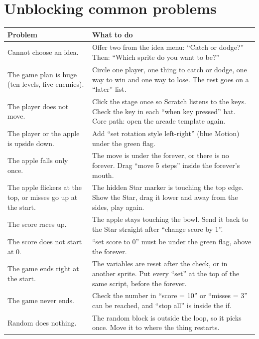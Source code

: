 \documentclass[track=junior,level=2,teacher]{kidscode}
\begin{document}
\section{Unblocking common problems}
\begin{center}\small\renewcommand{\arraystretch}{1.3}
\begin{longtable}{@{}>{\RaggedRight}p{5.2cm}>{\RaggedRight\arraybackslash}p{\dimexpr\linewidth-5.2cm-2\tabcolsep}@{}}
\toprule
\textbf{Problem} & \textbf{What to do}\\
\midrule\endhead
\bottomrule\endfoot
Cannot choose an idea. & Offer two from the idea menu: \enquote{Catch or dodge?} Then: \enquote{Which sprite do you want to be?}\\
The game plan is huge (ten levels, five enemies). & Circle one player, one thing to catch or dodge, one way to win and one way to lose. The rest goes on a \enquote{later} list.\\
The player does not move. & Click the stage once so Scratch listens to the keys. Check the key in each \enquote{when key pressed} hat. Core path: open the arcade template again.\\
The player or the apple is upside down. & Add \enquote{set rotation style left-right} (blue Motion) under the green flag.\\
The apple falls only once. & The move is under the forever, or there is no forever. Drag \enquote{move 5 steps} inside the forever's mouth.\\
The apple flickers at the top, or misses go up at the start. & The hidden Star marker is touching the top edge. Show the Star, drag it lower and away from the sides, play again.\\
The score races up. & The apple stays touching the bowl. Send it back to the Star straight after \enquote{change score by 1}.\\
The score does not start at 0. & \enquote{set score to 0} must be under the green flag, above the forever.\\
The game ends right at the start. & The variables are reset after the check, or in another sprite. Put every \enquote{set} at the top of the same script, before the forever.\\
The game never ends. & Check the number in \enquote{score = 10} or \enquote{misses = 3} can be reached, and \enquote{stop all} is inside the if.\\
Random does nothing. & The random block is outside the loop, so it picks once. Move it to where the thing restarts.\\

\end{longtable}
\end{center}
\end{document}
